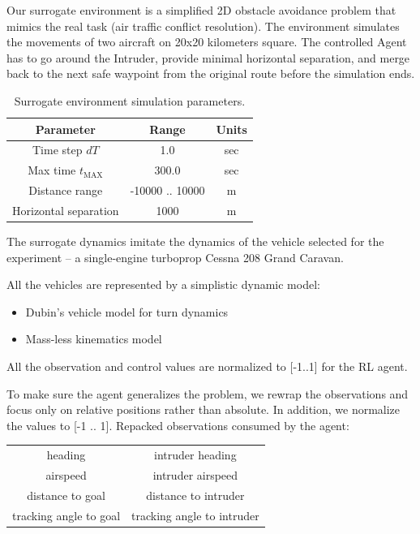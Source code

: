 Our surrogate environment is a simplified 2D obstacle avoidance problem that mimics the real task (air traffic conflict resolution). 
The environment simulates the movements of two aircraft on 20x20 kilometers square. The controlled Agent has to go around the Intruder, provide minimal horizontal separation, and merge back to the next safe waypoint from the original route before the simulation ends.

\begin{table}[h]
	\centering
	\begin{tabular}{||c | c | c||} 
		\hline
		Parameter & Range & Units \\
		\hline
		Time step $dT$ & 1.0  & sec \\
		Max time $t_\text{MAX}$ & 300.0  & sec \\
		Distance range & -10000 .. 10000  & m \\
		Horizontal separation & 1000  & m \\
		\hline
	\end{tabular}
	\caption{Surrogate environment simulation parameters.}
	\label{tbl:sim_param}
\end{table}


The surrogate dynamics imitate the dynamics of the vehicle selected for the experiment -- a single-engine turboprop Cessna 208 Grand Caravan.

All the vehicles are represented by a simplistic dynamic model:
\begin{itemize}
	\item Dubin's vehicle model for turn dynamics
	\item Mass-less kinematics model 
	\end {itemize}
	
	
	All the observation and control values are normalized to [-1..1] for the RL agent.
	
	To make sure the agent generalizes the problem, we rewrap the observations and focus only on relative positions rather than absolute. In addition, we normalize the values to [-1 .. 1].
	Repacked observations consumed by the agent:
	\begin{center}
		\begin{tabular}{|| c | c ||} 
			\hline
			heading & intruder heading\\
			airspeed & intruder airspeed\\
			distance to goal & distance to intruder\\
			tracking angle to goal & tracking angle to intruder\\
			\hline
		\end{tabular}
	\end{center}

